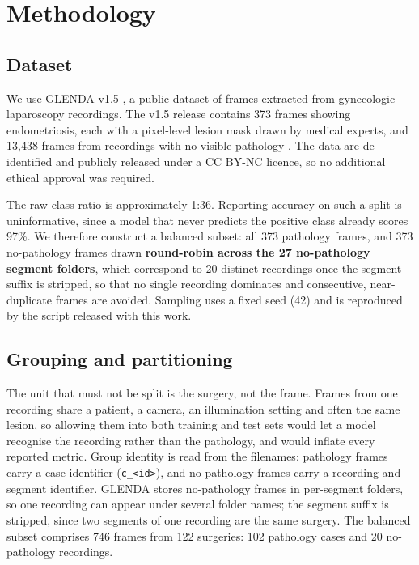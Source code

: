 \documentclass[preprint,12pt]{elsarticle}
\begin{document}
\section{Methodology}
\label{sec:method}

\subsection{Dataset}
\label{sec:dataset}

We use GLENDA v1.5 \cite{ref_a4}, a public dataset of frames extracted from gynecologic laparoscopy recordings. The v1.5 release contains 373 frames showing endometriosis, each with a pixel-level lesion mask drawn by medical experts, and 13,438 frames from recordings with no visible pathology \cite{ref_glenda_web}. The data are de-identified and publicly released under a CC BY-NC licence, so no additional ethical approval was required.

The raw class ratio is approximately 1:36. Reporting accuracy on such a split is uninformative, since a model that never predicts the positive class already scores 97\%. We therefore construct a balanced subset: all 373 pathology frames, and 373 no-pathology frames drawn \textbf{round-robin across the 27 no-pathology segment folders}, which correspond to 20 distinct recordings once the segment suffix is stripped, so that no single recording dominates and consecutive, near-duplicate frames are avoided. Sampling uses a fixed seed (42) and is reproduced by the script released with this work.

\subsection{Grouping and partitioning}
\label{sec:grouping}

The unit that must not be split is the surgery, not the frame. Frames from one recording share a patient, a camera, an illumination setting and often the same lesion, so allowing them into both training and test sets would let a model recognise the recording rather than the pathology, and would inflate every reported metric. Group identity is read from the filenames: pathology frames carry a case identifier (\texttt{c\_<id>}), and no-pathology frames carry a recording-and-segment identifier. GLENDA stores no-pathology frames in per-segment folders, so one recording can appear under several folder names; the segment suffix is stripped, since two segments of one recording are the same surgery. The balanced subset comprises 746 frames from 122 surgeries: 102 pathology cases and 20 no-pathology recordings.
\end{document}
